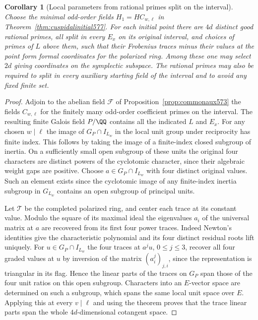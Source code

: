\documentclass[a4paper,11pt]{article}
\newtheorem{corollary}[proposition]{Corollary}
\theoremstyle{definition}
\theoremstyle{remark}
\numberwithin{equation}{section}
\begin{document}
\begin{corollary}[Local parameters from rational primes split on the interval]
\leavevmode\label{cor:polarsplit593}
Choose the minimal odd-order fields \(H_1=HC_{w,\ell}\)
in Theorem~\ref{thm:cuspidalinitial577}. For each initial
point there are \(4d\) distinct good rational primes, all
split in every \(E_x\) on its original interval, and choices
of primes of \(L\) above them, such that their Frobenius
traces minus their values at the point form formal coordinates
for the polarized ring. Among these one may select \(2d\)
giving coordinates on the symplectic subspace. The rational
primes may also be required to split in every auxiliary
starting field of the interval and to avoid any fixed finite set.
\end{corollary}
\begin{proof}
Adjoin to the abelian field \(\mathcal F\) of
Proposition~\ref{prop:commonaux573} the fields \(C_{w,\ell}\)
for the finitely many odd-order coefficient primes on the
interval. The resulting finite Galois field \(P/\QQ\) contains
all the indicated \(L\) and \(E_x\). For any chosen \(w\mid\ell\)
the image of \(G_P\cap I_{L_w}\) in the local unit group
under reciprocity has finite index. This follows by taking
the image of a finite-index closed subgroup of inertia.
On a sufficiently small open subgroup of these units the
original four characters are distinct powers of the
cyclotomic character, since their algebraic weight gaps
are positive. Choose \(a\in G_P\cap I_{L_w}\) with four
distinct original values. Such an element exists since the
cyclotomic image of any finite-index inertia subgroup in
\(G_{L_w}\) contains an open subgroup of principal units.

Let \(\mathcal T\) be the completed polarized ring, and
center each trace at its constant value. Modulo the square
of its maximal ideal the eigenvalues \(a_i\) of the
universal matrix at \(a\) are recovered from its first
four power traces. Indeed Newton's identities give the
characteristic polynomial and its four distinct residual
roots lift uniquely. For \(u\in G_P\cap I_{L_w}\) the
four traces at \(a^j u\), \(0\le j\le3\), recover all
four graded values at \(u\) by inversion of the matrix
\((a_i^j)_{j,i}\), since the representation is triangular
in its flag. Hence the linear parts of the traces on \(G_P\)
span those of the four unit ratios on this open subgroup.
Characters into an \(E\)-vector space are determined on
such a subgroup, which spans the same local unit space
over \(E\). Applying this at every \(v\mid\ell\) and using
the theorem proves that the trace linear parts span the
whole \(4d\)-dimensional cotangent space.


\end{proof}
\end{document}
